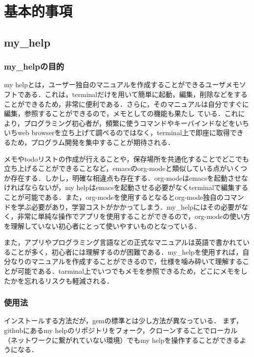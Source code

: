 \chapter{基本的事項}\label{ux57faux672cux7684ux4e8bux9805}

\section{my\_help}\label{my_help}

\subsection{my\_helpの目的}\label{my_helpux306eux76eeux7684}

my
helpとは，ユーザー独自のマニュアルを作成することができるユーザメモソフトである．これは，terminalだけを用いて簡単に起動，編集，削除などをすることができるため，非常に便利である．さらに，そのマニュアルは自分ですぐに編集，参照することができるので，メモとしての機能も果たし
ている．これにより，プログラミング初心者が，頻繁に使うコマンドやキーバインドなどをいちいちweb
browserを立ち上げて調べるのではなく，terminal上で即座に取得できるため，プログラム開発を集中することが期待される．

メモやtodoリストの作成が行えることや，保存場所を共通化することでどこでも立ち上げることができることなど，emacsのorg-modeと類似している点がいくつか存在する．しかし，明確な相違点も存在する．org-modeはemacsを起動させなければならないが，my
helpはemacsを起動させる必要がなくterminalで編集することが可能である．また，org-modeを使用するとなるとorg-mode独自のコマンドを学ぶ必要があり，学習コストがかかってしまう．my\_helpにはその必要がなく，非常に単純な操作でアプリを使用することができるので，org-modeの使い方を理解していない初心者にとって使いやすいものとなっている．

また，アプリやプログラミング言語などの正式なマニュアルは英語で書かれていることが多く，初心者には理解するのが困難である．my\_helpを使用すれば，自分なりのマニュアルを作成することができるので，仕様を噛み砕いて理解することが可能である．tarminal上でいつでもメモを参照できるため，どこにメモをしたかを忘れるリスクも軽減される．

\subsection{使用法}\label{ux4f7fux7528ux6cd5}

インストールする方法だが，gemの標準とは少し方法が異なっている．
まず，githubにあるmy
helpのリポジトリをフォーク，クローンすることでローカル（ネットワークに繋がれていない環境）でもmy
helpを操作することができるようになる．

